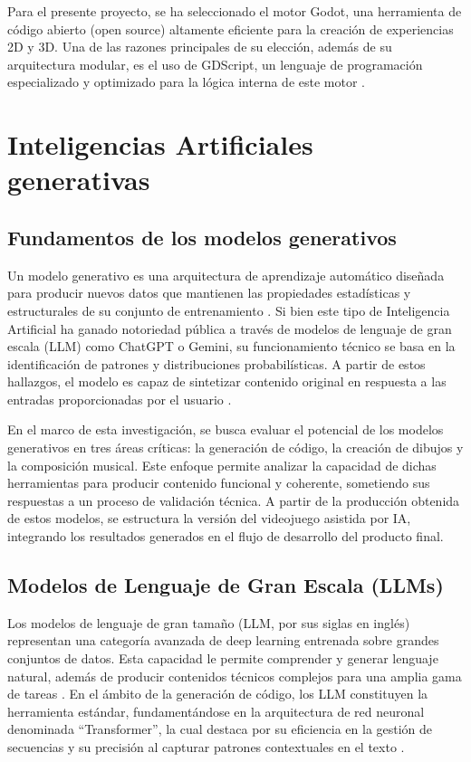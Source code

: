 Para el presente proyecto, se ha seleccionado el motor Godot, una herramienta de código abierto (open source) altamente eficiente para la creación de experiencias 2D y 3D. Una de las razones principales de su elección, además de su arquitectura modular, es el uso de GDScript, un lenguaje de programación especializado y optimizado para la lógica interna de este motor \cite{godot2026docs}.

\section{Inteligencias Artificiales generativas}
\subsection{Fundamentos de los modelos generativos}

Un modelo generativo es una arquitectura de aprendizaje automático diseñada para producir nuevos datos que mantienen las propiedades estadísticas y estructurales de su conjunto de entrenamiento \cite{belcic2025generative}. Si bien este tipo de Inteligencia Artificial ha ganado notoriedad pública a través de modelos de lenguaje de gran escala (LLM) como ChatGPT o Gemini, su funcionamiento técnico se basa en la identificación de patrones y distribuciones probabilísticas. A partir de estos hallazgos, el modelo es capaz de sintetizar contenido original en respuesta a las entradas proporcionadas por el usuario \cite{belcic2025generative}.

En el marco de esta investigación, se busca evaluar el potencial de los modelos generativos en tres áreas críticas: la generación de código, la creación de dibujos y la composición musical. Este enfoque permite analizar la capacidad de dichas herramientas para producir contenido funcional y coherente, sometiendo sus respuestas a un proceso de validación técnica. A partir de la producción obtenida de estos modelos, se estructura la versión del videojuego asistida por IA, integrando los resultados generados en el flujo de desarrollo del producto final.

\subsection{Modelos de Lenguaje de Gran Escala (LLMs)}

Los modelos de lenguaje de gran tamaño (LLM, por sus siglas en inglés) representan una categoría avanzada de deep learning entrenada sobre grandes conjuntos de datos. Esta capacidad le permite comprender y generar lenguaje natural, además de producir contenidos técnicos complejos para una amplia gama de tareas \cite{stryker2025llm}. En el ámbito de la generación de código, los LLM constituyen la herramienta estándar, fundamentándose en la arquitectura de red neuronal denominada “Transformer”, la cual destaca por su eficiencia en la gestión de secuencias y su precisión al capturar patrones contextuales en el texto \cite{stryker2025llm}.

